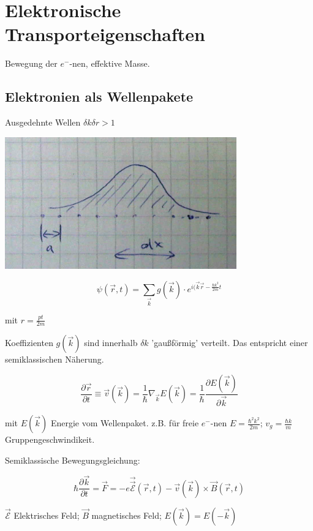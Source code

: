 

\tableofcontents
\setcounter{chapter}{9}
\chapter{Elektronische Transporteigenschaften}

Bewegung der \(e^-\)-nen, effektive Masse.

\section{Elektronien als Wellenpakete}

Ausgedehnte Wellen \(\delta k\delta r > 1\)

\includegraphics[width=0.75\textwidth]{kap10_01.png}

\[\psi(\vec r,t) = \sum_{\vec k} g(\vec k)\cdot e^{i(\vec k\vec r - \frac{\hbar k^2}{2m}t}\]

mit \(r= \frac{pt}{2m}\)

Koeffizienten \(g(\vec k)\) sind innerhalb \(\delta k\) 'gaußförmig' verteilt. Das entspricht einer semiklassischen Näherung. 

\[\frac{\partial \vec r}{\partial t} \equiv \vec v(\vec k) = \frac{1}{\hbar}\nabla_{\vec k}E(\vec k) = \frac{1}{\hbar} \frac{\partial E(\vec k)}{\partial \vec k} \]

mit \(E(\vec k) \) Energie vom Wellenpaket. z.B. für freie \(e^-\)-nen \(E=\frac{\hbar^2 k^2}{2m}\); \(v_g=\frac{\hbar k}{m}\) Gruppengeschwindikeit.

Semiklassische Bewegungsgleichung:

\[\hbar \frac{\partial \vec k}{\partial t}=\vec F = -e\vec \vec{ \mathcal E}(\vec r,t) -\vec v(\vec k)\times \vec B(\vec r,t)  \]

\(\vec{ \mathcal E}\) Elektrisches Feld; \(\vec B\) magnetisches Feld; \(E(\vec k) = E(-\vec k)\)


